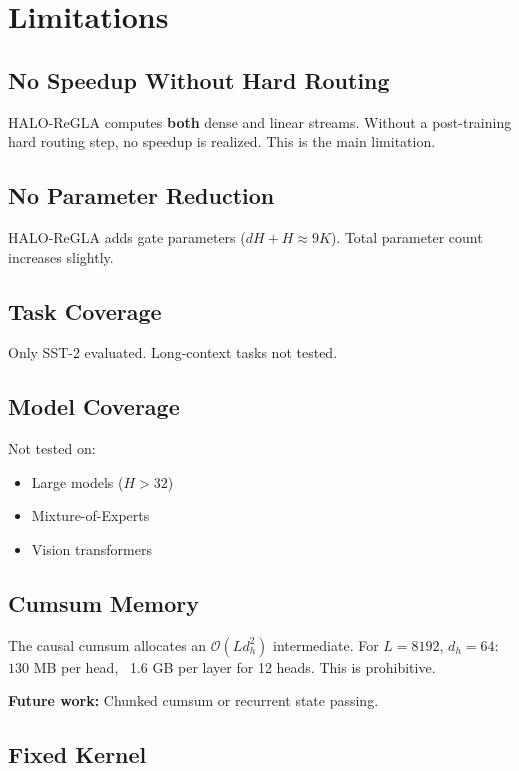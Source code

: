 
\section{Limitations}

\subsection{No Speedup Without Hard Routing}

HALO-ReGLA computes \textbf{both} dense and linear streams. Without a post-training 
hard routing step, no speedup is realized. This is the main limitation.

\subsection{No Parameter Reduction}

HALO-ReGLA adds gate parameters ($dH + H \approx 9K$). Total parameter count 
increases slightly.

\subsection{Task Coverage}

Only SST-2 evaluated. Long-context tasks not tested.

\subsection{Model Coverage}

Not tested on:
\begin{itemize}
\item Large models ($H > 32$)
\item Mixture-of-Experts
\item Vision transformers

\end{itemize}
\subsection{Cumsum Memory}

The causal cumsum allocates an $\mathcal{O}(L d_h^2)$ intermediate. For 
$L = 8192$, $d_h = 64$: ~$130$ MB per head, ~1.6 GB per layer for 12 heads. 
This is prohibitive.

\textbf{Future work:} Chunked cumsum or recurrent state passing.

\subsection{Fixed Kernel}


